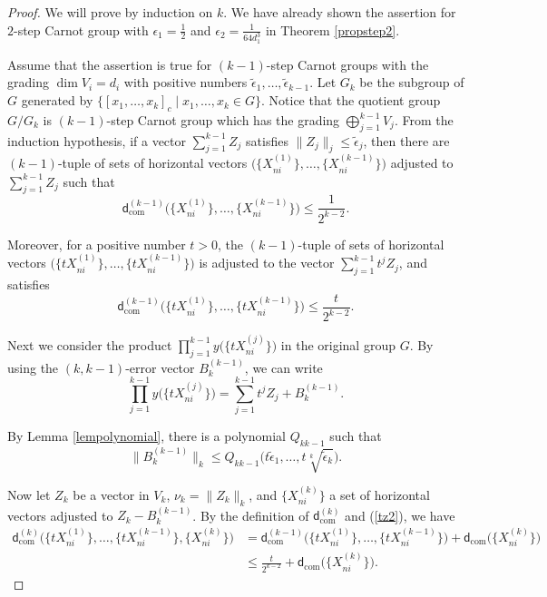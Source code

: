 \documentclass[10pt,a4paper]{amsart}
\numberwithin{equation}{section}
\begin{document}
\begin{proof}
 We will prove by induction on $k$.
 We have already shown the assertion for $2$-step Carnot group with $\epsilon_1=\frac{1}{2}$ and $\epsilon_2=\frac{1}{64d_1^3}$ in Theorem \ref{propstep2}.

 Assume that the assertion is true for $(k-1)$-step Carnot groups with the grading $\dim V_i=d_i$ with positive numbers $\tilde{\epsilon}_1,\dots,\tilde{\epsilon}_{k-1}$.
 Let $G_k$ be the subgroup of $G$ generated by $\{[x_1,\dots,x_k]_c\mid x_1,\dots,x_k\in G\}$.
 Notice that the quotient group $G/G_k$ is $(k-1)$-step Carnot group which has the grading $\bigoplus_{j=1}^{k-1}V_j$.
 From the induction hypothesis,
 if a vector $\sum_{j=1}^{k-1}Z_j$ satisfies $\|Z_j\|_j\leq \tilde{\epsilon}_j$,
 then there are $(k-1)$-tuple of sets of horizontal vectors $\big(\bigl\{X_{ni}^{(1)}\bigr\},\dots,\bigl\{X_{ni}^{(k-1)}\bigr\}\big)$ adjusted to $\sum_{j=1}^{k-1}Z_j$ such that
 \[
 \mathsf{d}_{\mathrm{com}}^{(k-1)}\big(\bigl\{X_{ni}^{(1)}\bigr\}, \dots,\bigl\{X_{ni}^{(k-1)}\bigr\}\big)\leq \frac{1}{2^{k-2}}.
 \]

 Moreover,
 for a positive number $t>0$,
 the $(k-1)$-tuple of sets of horizontal vectors $\big(\bigl\{tX_{ni}^{(1)}\bigr\},\dots,\bigl\{tX_{ni}^{(k-1)}\bigr\}\big)$ is adjusted to the vector $\sum_{j=1}^{k-1}t^jZ_j$,
 and satisfies
 \begin{equation}\label{tz2}
 \mathsf{d}_{\mathrm{com}}^{(k-1)}\big(\bigl\{tX_{ni}^{(1)}\bigr\},\dots,\bigl\{tX_{ni}^{(k-1)}\bigr\}\big)\leq \frac{t}{2^{k-2}}.
 \end{equation}

 Next we consider the product $\prod_{j=1}^{k-1}y\big(\bigl\{tX_{ni}^{(j)}\bigr\}\big)$ in the original group $G$.
 By using the \mbox{$(k,k-1)$}-error vector $B_k^{(k-1)}$,
 we can write
 \[
 \prod_{j=1}^{k-1}y\big(\bigl\{tX_{ni}^{(j)}\bigr\}\big)=\sum_{j=1}^{k-1}t^jZ_j+B_k^{(k-1)}.
 \]

By Lemma \ref{lempolynomial},
there is a polynomial $Q_{kk-1}$ such that
\[
\big\|B_k^{(k-1)}\big\|_k\leq Q_{kk-1}\bigl(t\tilde{\epsilon}_1,\dots,t\sqrt[k]{\tilde{\epsilon}_{k}}\bigr).
\]

 Now let $Z_k$ be a vector in $V_k$,
 $\nu_k=\|Z_k\|_k$,
 and $\bigl\{X_{ni}^{(k)}\bigr\}$ a set of horizontal vectors adjusted to $Z_k-B_k^{(k-1)}$.
 By the definition of $\mathsf{d}_{\mathrm{com}}^{(k)}$ and (\ref{tz2}),
 we have
 \begin{align*}
 \mathsf{d}_{\mathrm{com}}^{(k)}\big(\bigl\{tX_{ni}^{(1)}\bigr\}, \dots,\bigl\{tX_{ni}^{(k-1)}\bigr\},\bigl\{X_{ni}^{(k)}\bigr\}\big)
 &=\mathsf{d}_{\mathrm{com}}^{(k-1)}\big(\bigl\{tX_{ni}^{(1)}\bigr\}, \dots,\bigl\{tX_{ni}^{(k-1)}\bigr\}\big)+\mathsf{d}_{\mathrm{com}}\big(\bigl\{X_{ni}^{(k)}\bigr\}\big)
\\
& \leq \frac{t}{2^{k-2}}+\mathsf{d}_{\mathrm{com}}\big(\bigl\{X_{ni}^{(k)}\bigr\}\big).
 \end{align*}


\end{proof}
\end{document}

